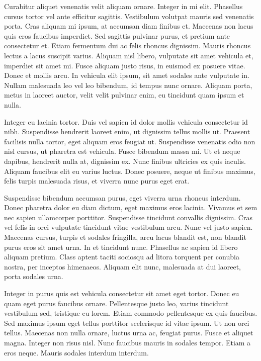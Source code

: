 \documentclass[a4paper,twoside,notitlepage,openright,11pt]{report}
\begin{document}
Curabitur aliquet venenatis velit aliquam ornare. Integer in mi elit. Phasellus cursus tortor vel ante efficitur sagittis. Vestibulum volutpat mauris sed venenatis porta. Cras aliquam mi ipsum, at accumsan diam finibus et. Maecenas non lacus quis eros faucibus imperdiet. Sed sagittis pulvinar purus, et pretium ante consectetur et. Etiam fermentum dui ac felis rhoncus dignissim. Mauris rhoncus lectus a lacus suscipit varius. Aliquam nisl libero, vulputate sit amet vehicula et, imperdiet sit amet mi. Fusce aliquam justo risus, in euismod ex posuere vitae. Donec et mollis arcu. In vehicula elit ipsum, sit amet sodales ante vulputate in. Nullam malesuada leo vel leo bibendum, id tempus nunc ornare. Aliquam porta, metus in laoreet auctor, velit velit pulvinar enim, eu tincidunt quam ipsum et nulla.

Integer eu lacinia tortor. Duis vel sapien id dolor mollis vehicula consectetur id nibh. Suspendisse hendrerit laoreet enim, ut dignissim tellus mollis ut. Praesent facilisis nulla tortor, eget aliquam eros feugiat ut. Suspendisse venenatis odio non nisl cursus, ut pharetra est vehicula. Fusce bibendum massa mi. Ut et neque dapibus, hendrerit nulla at, dignissim ex. Nunc finibus ultricies ex quis iaculis. Aliquam faucibus elit eu varius luctus. Donec posuere, neque ut finibus maximus, felis turpis malesuada risus, et viverra nunc purus eget erat.

Suspendisse bibendum accumsan purus, eget viverra urna rhoncus interdum. Donec pharetra dolor eu diam dictum, eget maximus eros lacinia. Vivamus et sem nec sapien ullamcorper porttitor. Suspendisse tincidunt convallis dignissim. Cras vel felis in orci vulputate tincidunt vitae vestibulum arcu. Nunc vel justo sapien. Maecenas cursus, turpis et sodales fringilla, arcu lacus blandit est, non blandit purus eros sit amet urna. In et tincidunt nunc. Phasellus ac sapien id libero aliquam pretium. Class aptent taciti sociosqu ad litora torquent per conubia nostra, per inceptos himenaeos. Aliquam elit nunc, malesuada at dui laoreet, porta sodales urna.

Integer in purus quis est vehicula consectetur sit amet eget tortor. Donec eu quam eget purus faucibus ornare. Pellentesque justo leo, varius tincidunt vestibulum sed, tristique eu lorem. Etiam commodo pellentesque ex quis faucibus. Sed maximus ipsum eget tellus porttitor scelerisque id vitae ipsum. Ut non orci tellus. Maecenas non nulla ornare, luctus urna ac, feugiat purus. Fusce et aliquet magna. Integer non risus nisl. Nunc faucibus mauris in sodales tempor. Etiam a eros neque. Mauris sodales interdum interdum.
\end{document}
